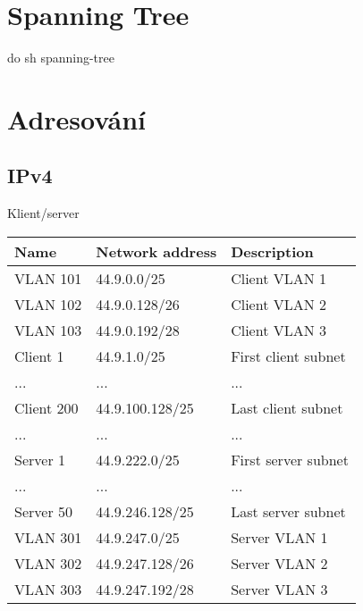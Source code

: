 \documentclass[czech,master,dept460,male,cpp,cpdeclaration]{diploma}
\begin{document}
\newpage
\section{Spanning Tree}
\label{sec:Sec03}
\noindent do sh spanning-tree

\newpage
\section{Adresování}
\label{sec:Sec04}

\subsection{IPv4}
\label{subsec:Sec041}
\noindent Klient/server
\begin{center}
	\begin{tabular}{l|l|l}
		Name & Network address & Description \\
		\hline
		VLAN 101 & 44.9.0.0/25 & Client VLAN 1\\
		VLAN 102 & 44.9.0.128/26 & Client VLAN 2\\
		VLAN 103 & 44.9.0.192/28 & Client VLAN 3\\
		Client 1 & 44.9.1.0/25 & First client subnet\\
		... & ... & ...\\
		Client 200 & 44.9.100.128/25 & Last client subnet\\
		... & ... & ...\\
		Server 1 & 44.9.222.0/25 & First server subnet\\
		... & ... & ...\\
		Server 50 & 44.9.246.128/25 & Last server subnet\\
		VLAN 301 & 44.9.247.0/25 & Server VLAN 1\\
		VLAN 302 & 44.9.247.128/26 & Server VLAN 2\\
		VLAN 303 & 44.9.247.192/28 & Server VLAN 3\\
	\end{tabular}
\end{center}
\end{document}
